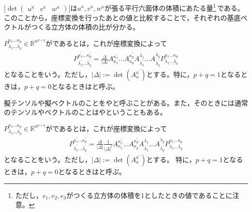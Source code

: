 \documentclass[uplatex]{jsarticle}
\begin{document}
$\left| \det \begin{pmatrix} u^{\kappa} & v^{\kappa} & w^{\kappa} \end{pmatrix} \right|$は$u^{\kappa}, v^{\kappa}, w^{\kappa}$が張る平行六面体の体積にあたる量\footnote{ただし，$e_{1},e_{2},e_{3}$がつくる立方体の体積を1としたときの値であることに注意。}\,である。このことから，座標変換を行ったあとの値と比較することで，それぞれの基底ベクトルがつくる立方体の体積の比が分かる。

\begin{teigi}[擬テンソル]
  $P^{\kappa_{1}\dots\kappa_{p}}_{\lambda_{1}\dots\lambda_{q}} \in \mathbb{R}^{n^{p+q}}$がであるとは，これが座標変換によって
  \begin{align}
    P^{\kappa^{\prime}_{1}\dots\kappa^{\prime}_{p}}_{\lambda^{\prime}_{1}\dots\lambda^{\prime}_{q}} = \frac{\Delta}{\left| \Delta \right|} A^{\kappa^{\prime}_{1}}_{\kappa_{1}} \dots A^{\kappa^{\prime}_{p}}_{\kappa_{p}} A_{\lambda^{\prime}_{1}}^{\lambda_{1}} \dots A_{\lambda^{\prime}_{q}}^{\lambda_{q}} P^{\kappa_{1}\dots\kappa_{p}}_{\lambda_{1}\dots\lambda_{q}}
  \end{align}
  となることをいう。ただし，$\left|\Delta\right| := \det (A^{\kappa^{\prime}}_{\kappa})$とする。特に，$p+q=1$となるときは，$p+q=0$となるときはと呼ぶ。
\end{teigi}

擬テンソルや擬ベクトルのことをやと呼ぶことがある。また，そのときには通常のテンソルやベクトルのことはやということもある。

\begin{teigi}[擬テンソル密度]
  $P^{\kappa_{1}\dots\kappa_{p}}_{\lambda_{1}\dots\lambda_{q}} \in \mathbb{R}^{n^{p+q}}$がであるとは，これが座標変換によって
  \begin{align}
    P^{\kappa^{\prime}_{1}\dots\kappa^{\prime}_{p}}_{\lambda^{\prime}_{1}\dots\lambda^{\prime}_{q}} = \frac{\Delta}{\left| \Delta \right|} \frac{1}{\left|\Delta\right|^{t}} A^{\kappa^{\prime}_{1}}_{\kappa_{1}} \dots A^{\kappa^{\prime}_{p}}_{\kappa_{p}} A_{\lambda^{\prime}_{1}}^{\lambda_{1}} \dots A_{\lambda^{\prime}_{q}}^{\lambda_{q}} P^{\kappa_{1}\dots\kappa_{p}}_{\lambda_{1}\dots\lambda_{q}}
  \end{align}
  となることをいう。ただし，$\left|\Delta\right| := \det (A^{\kappa^{\prime}}_{\kappa})$とする。
  特に，$p+q=1$となるときは，$p+q=0$となるときはと呼ぶ。
\end{teigi}
\end{document}
